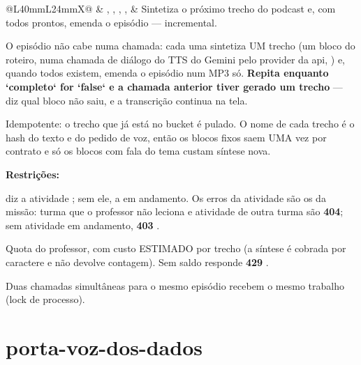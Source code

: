 \begin{tabularx}{\linewidth}{@{}L{40mm}L{24mm}X@{}}
 & , , , ,  & Sintetiza o próximo trecho do podcast e, com todos prontos, emenda o episódio --- incremental.\par O episódio não cabe numa chamada: cada uma sintetiza UM trecho (um bloco do roteiro, numa chamada de diálogo do TTS do Gemini pelo provider da api, ) e, quando todos existem, emenda o episódio num MP3 só. \textbf{Repita enquanto `completo` for `false` e a chamada anterior tiver gerado um trecho} ---  diz qual bloco não saiu, e a transcrição continua na tela.\par Idempotente: o trecho que já está no bucket é pulado. O nome de cada trecho é o hash do texto e do pedido de voz, então os blocos fixos saem UMA vez por contrato e só os blocos com fala do tema custam síntese nova.\par \textbf{Restrições:}\par \hspace*{1em}\textbullet{}  diz a atividade ; sem ele, a em andamento. Os erros da atividade são os da missão: turma que o professor não leciona e atividade de outra turma são \textbf{404}; sem atividade em andamento, \textbf{403} .\par \hspace*{1em}\textbullet{} Quota do professor, com custo ESTIMADO por trecho (a síntese é cobrada por caractere e não devolve contagem). Sem saldo responde \textbf{429} .\par \hspace*{1em}\textbullet{} Duas chamadas simultâneas para o mesmo episódio recebem o mesmo trabalho (lock de processo).\\
\bottomrule
\end{tabularx}

\section{porta-voz-dos-dados}


